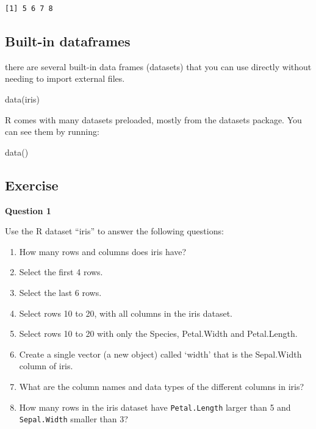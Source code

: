 \documentclass[
  letterpaper,
  DIV=11,
  numbers=noendperiod]{scrreprt}
\newenvironment{Shaded}{\begin{snugshade}}{\end{snugshade}}
\newcommand{\FunctionTok}[1]{\textcolor[rgb]{0.28,0.35,0.67}{#1}}
\newcommand{\NormalTok}[1]{\textcolor[rgb]{0.00,0.23,0.31}{#1}}
\begin{document}
\begin{verbatim}
[1] 5 6 7 8
\end{verbatim}

\subsection{Built-in dataframes}\label{built-in-dataframes}

there are several built-in data frames (datasets) that you can use
directly without needing to import external files.

\begin{Shaded}
\begin{Highlighting}[]
\FunctionTok{data}\NormalTok{(iris)}
\end{Highlighting}
\end{Shaded}

R comes with many datasets preloaded, mostly from the datasets package.
You can see them by running:

\begin{Shaded}
\begin{Highlighting}[]
\FunctionTok{data}\NormalTok{()}
\end{Highlighting}
\end{Shaded}

\subsection{Exercise}\label{exercise-6}

\textbf{Question 1}

Use the R dataset ``iris'' to answer the following questions:

\begin{enumerate}
\def\labelenumi{\arabic{enumi}.}
\item
  How many rows and columns does iris have?
\item
  Select the first 4 rows.
\item
  Select the last 6 rows.
\item
  Select rows 10 to 20, with all columns in the iris dataset.
\item
  Select rows 10 to 20 with only the Species, Petal.Width and
  Petal.Length.
\item
  Create a single vector (a new object) called `width' that is the
  Sepal.Width column of iris.
\item
  What are the column names and data types of the different columns in
  iris?
\item
  How many rows in the iris dataset have \texttt{Petal.Length} larger
  than 5 and \texttt{Sepal.Width} smaller than 3?
\end{enumerate}
\end{document}
